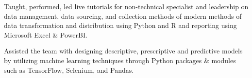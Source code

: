 \begin{cventries}
{\begin{cvitems}
        \item Taught, performed, led live tutorials for non-technical specialist and leadership on data management, data sourcing, and collection methods of modern methods of data transformation and distribution using Python and R and reporting using Microsoft Excel \& PowerBI.
        \item Assisted the team with designing descriptive, prescriptive and predictive models by utilizing machine learning techniques through Python packages \& modules such as TensorFlow, Selenium, and Pandas.
      \end{cvitems}
    }







\end{cventries}
